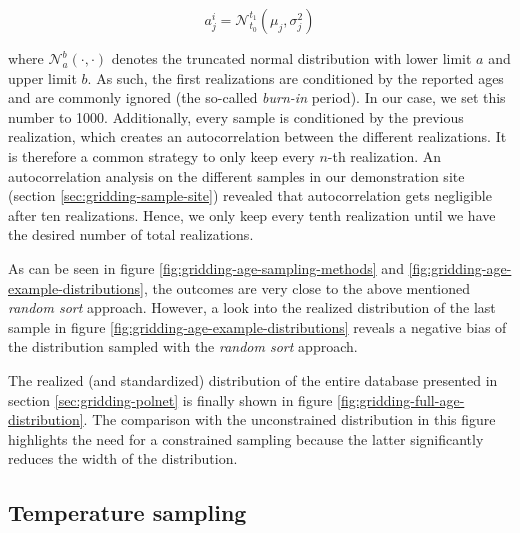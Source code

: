 \begin{refsection}
\begin{equation}
	a^{i}_j = \mathcal{N}^{t_1}_{t_0}(\mu_j, \sigma_j^2)
\end{equation}

where $\mathcal{N}^b_a(\cdot, \cdot)$ denotes the truncated normal distribution with lower limit $a$ and upper limit $b$. As such, the first realizations are conditioned by the reported ages and are commonly ignored (the so-called \textit{burn-in} period). In our case, we set this number to 1000. 
Additionally, every sample is conditioned by the previous realization, which creates an autocorrelation between the different realizations. It is therefore a common strategy to only keep every $n$-th realization. An autocorrelation analysis on the different samples in our demonstration site (section \ref{sec:gridding-sample-site}) revealed that autocorrelation gets negligible after ten realizations. Hence, we only keep every tenth realization until we have the desired number of total realizations.

As can be seen in figure \ref{fig:gridding-age-sampling-methods} and \ref{fig:gridding-age-example-distributions}, the outcomes are very close to the above mentioned \textit{random sort} approach. However, a look into the realized distribution of the last sample in figure \ref{fig:gridding-age-example-distributions} reveals a negative bias of the distribution sampled with the \textit{random sort} approach.

The realized (and standardized) distribution of the entire database presented in section \ref{sec:gridding-polnet} is finally shown in figure \ref{fig:gridding-full-age-distribution}. The comparison with the unconstrained distribution in this figure highlights the need for a constrained sampling because the latter significantly reduces the width of the distribution.

\subsection{Temperature sampling}  \label{sec:gridding-temperature-sampling}


\end{refsection}
